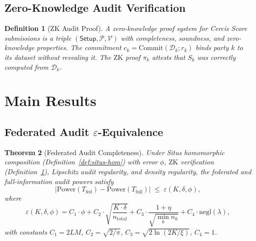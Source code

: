 \documentclass[12pt,a4paper]{article}
\newtheorem{theorem}{Theorem}[section]
\newtheorem{definition}[theorem]{Definition}
\newcommand{\cD}{\mathcal{D}}
\newcommand{\Commit}{\mathrm{Commit}}
\newcommand{\ZK}{\mathrm{ZK}}
\newcommand{\negl}{\mathrm{negl}}
\newcommand{\Power}{\mathrm{Power}}
\begin{document}
\subsection{Zero-Knowledge Audit Verification}

\begin{definition}[ZK Audit Proof]
\label{def:zk-proof}
A zero-knowledge proof system for Cercis Score submissions is a triple $(\mathsf{Setup}, \mathcal{P}, \mathcal{V})$ with completeness, soundness, and zero-knowledge properties. The commitment $c_k = \Commit(\cD_k; r_k)$ binds party $k$ to its dataset without revealing it. The $\ZK$ proof $\pi_k$ attests that $S_k$ was correctly computed from $\cD_k$.
\end{definition}

\section{Main Results}

\subsection{Federated Audit $\varepsilon$-Equivalence}

\begin{theorem}[Federated Audit Completeness]
\label{thm:fed-equiv}
Under Situs homomorphic composition (Definition~\ref{def:situs-hom}) with error $\phi$, $\ZK$ verification (Definition~\ref{def:zk-proof}), Lipschitz audit regularity, and density regularity, the federated and full-information audit powers satisfy
\begin{equation}\label{eq:fed-equiv-bound}
    \big|\Power(T_{\mathrm{fed}}) - \Power(T_{\mathrm{full}})\big|
    \;\leq\; \varepsilon(K, \delta, \phi),
\end{equation}
where
\begin{equation}\label{eq:epsilon-def}
    \varepsilon(K, \delta, \phi) =
    C_1 \cdot \phi
    + C_2 \cdot \sqrt{\frac{K \cdot \delta}{n_{\mathrm{total}}}}
    + C_3 \cdot \frac{1 + \eta}{\sqrt{\min_k n_k}}
    + C_4 \cdot \negl(\lambda),
\end{equation}
with constants $C_1 = 2LM$, $C_2 = \sqrt{2/\pi}$, $C_3 = \sqrt{2\ln(2K/\xi)}$, $C_4 = 1$.
\end{theorem}
\end{document}
